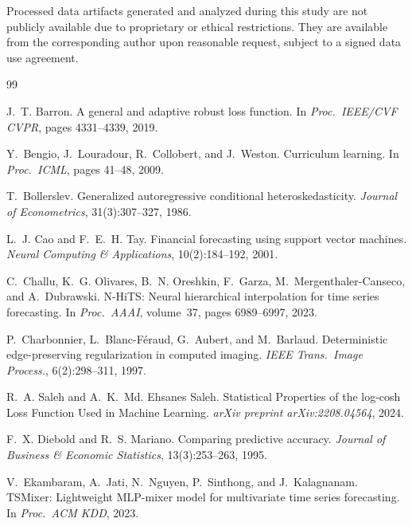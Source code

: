 \documentclass[11pt]{article}
\begin{document}
Processed data artifacts generated and analyzed during this study are not publicly available due to proprietary or ethical restrictions. They are available from the corresponding author upon reasonable request, subject to a signed data use agreement.

\begin{thebibliography}{99}


J.~T. Barron.
A general and adaptive robust loss function.
In \emph{Proc.\ IEEE/CVF CVPR}, pages 4331--4339, 2019.

Y.~Bengio, J.~Louradour, R.~Collobert, and J.~Weston.
Curriculum learning.
In \emph{Proc.\ ICML}, pages 41--48, 2009.

T.~Bollerslev.
Generalized autoregressive conditional heteroskedasticity.
\emph{Journal of Econometrics}, 31(3):307--327, 1986.

L.~J. Cao and F.~E.~H. Tay.
Financial forecasting using support vector machines.
\emph{Neural Computing \& Applications}, 10(2):184--192, 2001.

C.~Challu, K.~G. Olivares, B.~N. Oreshkin, F.~Garza,
M.~Mergenthaler-Canseco, and A.~Dubrawski.
N-HiTS: Neural hierarchical interpolation for time series forecasting.
In \emph{Proc.\ AAAI}, volume~37, pages 6989--6997, 2023.

P.~Charbonnier, L.~Blanc-F{\'e}raud, G.~Aubert, and M.~Barlaud.
Deterministic edge-preserving regularization in computed imaging.
\emph{IEEE Trans.\ Image Process.}, 6(2):298--311, 1997.

R.~A. Saleh and A.~K.~Md. Ehsanes Saleh.
Statistical Properties of the log-cosh Loss Function Used in Machine Learning.
\emph{arXiv preprint arXiv:2208.04564}, 2024.

F.~X. Diebold and R.~S. Mariano.
Comparing predictive accuracy.
\emph{Journal of Business \& Economic Statistics}, 13(3):253--263, 1995.

V.~Ekambaram, A.~Jati, N.~Nguyen, P.~Sinthong, and J.~Kalagnanam.
TSMixer: Lightweight MLP-mixer model for multivariate time series forecasting.
In \emph{Proc.\ ACM KDD}, 2023.


\end{thebibliography}
\end{document}

